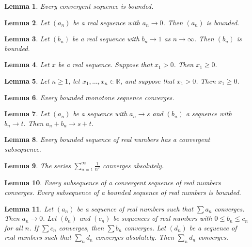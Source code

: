 \documentclass{article}
\newtheorem{lemma}{Lemma}
\begin{document}
\begin{lemma}\label{convergent-bounded}
Every convergent sequence is bounded.
\end{lemma}

\begin{lemma}\label{bare-limit}
Let $(a_n)$ be a real sequence with $a_n\to0$. Then $(a_n)$ is bounded.
\end{lemma}

\begin{lemma}\label{as-limit}
Let $(b_n)$ be a real sequence with $b_n\to1$ as $n\to\infty$. Then $(b_n)$ is bounded.
\end{lemma}

\begin{lemma}\label{suppose-term}
Let $x$ be a real sequence. Suppose that $x_1>0$. Then $x_1\ge0$.
\end{lemma}

\begin{lemma}\label{let-suppose-terms}
Let $n\ge1$, let $x_1,\ldots,x_n\in\mathbb{R}$, and suppose that $x_1>0$. Then $x_1\ge0$.
\end{lemma}

\begin{lemma}\label{every-converges}
Every bounded monotone sequence converges.
\end{lemma}

\begin{lemma}\label{sum-of-limits}
Let $(a_n)$ be a sequence with $a_n\to s$ and $(b_n)$ a sequence with $b_n\to t$. Then $a_n+b_n\to s+t$.
\end{lemma}

\begin{lemma}\label{bolzano-weierstrass}
Every bounded sequence of real numbers has a convergent subsequence.
\end{lemma}

\begin{lemma}\label{absolutely}
The series $\sum_{n=1}^\infty\frac{1}{n^2}$ converges absolutely.
\end{lemma}

\begin{lemma}\label{subsequences}
Every subsequence of a convergent sequence of real numbers converges. Every subsequence of a bounded sequence of real numbers is bounded.
\end{lemma}

\begin{lemma}\label{bare-series}
Let $(a_n)$ be a sequence of real numbers such that $\sum a_n$ converges. Then $a_n\to0$. Let $(b_n)$ and $(c_n)$ be sequences of real numbers with $0\le b_n\le c_n$ for all $n$. If $\sum c_n$ converges, then $\sum b_n$ converges. Let $(d_n)$ be a sequence of real numbers such that $\sum_n d_n$ converges absolutely. Then $\sum_n d_n$ converges.
\end{lemma}
\end{document}

